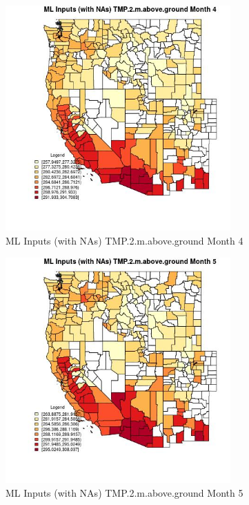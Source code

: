 \begin{figure} 
\centering  
\includegraphics[width=0.77\textwidth]{Code_Outputs/Report_ML_input_PM25_Step4_part_f_de_duplicated_aves_prioritize_24hr_obswNAs_CountyTMP2mabovegroundmedianMonth4.jpg} 
\caption{\label{fig:Report_ML_input_PM25_Step4_part_f_de_duplicated_aves_prioritize_24hr_obswNAsCountyTMP2mabovegroundmedianMonth4}ML Inputs (with NAs) TMP.2.m.above.ground Month 4} 
\end{figure} 
 

\clearpage 

\begin{figure} 
\centering  
\includegraphics[width=0.77\textwidth]{Code_Outputs/Report_ML_input_PM25_Step4_part_f_de_duplicated_aves_prioritize_24hr_obswNAs_CountyTMP2mabovegroundmedianMonth5.jpg} 
\caption{\label{fig:Report_ML_input_PM25_Step4_part_f_de_duplicated_aves_prioritize_24hr_obswNAsCountyTMP2mabovegroundmedianMonth5}ML Inputs (with NAs) TMP.2.m.above.ground Month 5} 
\end{figure} 
 

